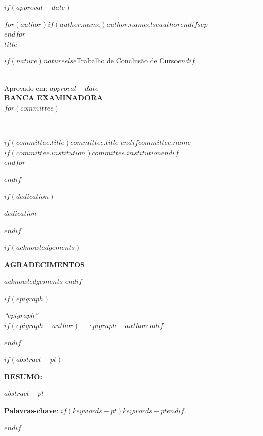 \documentclass[
  12pt,
  oneside,
  a4paper,
  chapter=TITLE,
  english,
  $if(lang)$$lang$$else$portuguese$endif$
]{abntex2}
\renewcommand{\ABNTEXchapterfont}{\bfseries}
\begin{document}
$if(approval-date)$
\newpage
\thispagestyle{empty}
\begin{center}
  {\ABNTEXchapterfont\bfseries\large
    $for(author)$$if(author.name)$\MakeUppercase{$author.name$}$else$\MakeUppercase{$author$}$endif$$sep$\\$endfor$
  }\\[1cm]
  {\ABNTEXchapterfont\bfseries\large \MakeUppercase{$title$}}\\[1cm]
  \hspace*{8cm}\parbox{8cm}{\normalsize\normalfont
    $if(nature)$$nature$$else$Trabalho de Conclusão de Curso$endif$
  }\\[1cm]
  Aprovado em: $approval-date$\\[2cm]
  {\bfseries BANCA EXAMINADORA}\\[1.5cm]
  $for(committee)$
  \rule{8cm}{0.4pt}\\
  $if(committee.title)$$committee.title$ $endif$$committee.name$\\
  $if(committee.institution)$$committee.institution$$endif$\\[1.5cm]
  $endfor$
\end{center}
$endif$

$if(dedication)$
\newpage
\thispagestyle{empty}
\vspace*{\fill}
\hspace*{8cm}\parbox{8cm}{\normalfont\itshape $dedication$}
$endif$

$if(acknowledgements)$
\newpage
\thispagestyle{empty}
\begin{center}{\ABNTEXchapterfont\bfseries\normalsize AGRADECIMENTOS}\end{center}
\vspace{\onelineskip}
$acknowledgements$
\clearpage
$endif$

$if(epigraph)$
\newpage
\thispagestyle{empty}
\vspace*{\fill}
\hspace*{8cm}\parbox{8cm}{\normalfont\itshape
  ``$epigraph$''\\
  $if(epigraph-author)$\hfill --- $epigraph-author$$endif$
}
$endif$

$if(abstract-pt)$
\newpage
\thispagestyle{empty}
\begin{resumoumacoluna}
\noindent\textbf{RESUMO:}\vspace{\onelineskip}

$abstract-pt$

\vspace{\onelineskip}
\noindent\textbf{Palavras-chave}: $if(keywords-pt)$$keywords-pt$$endif$.
\end{resumoumacoluna}
\clearpage
$endif$
\end{document}
